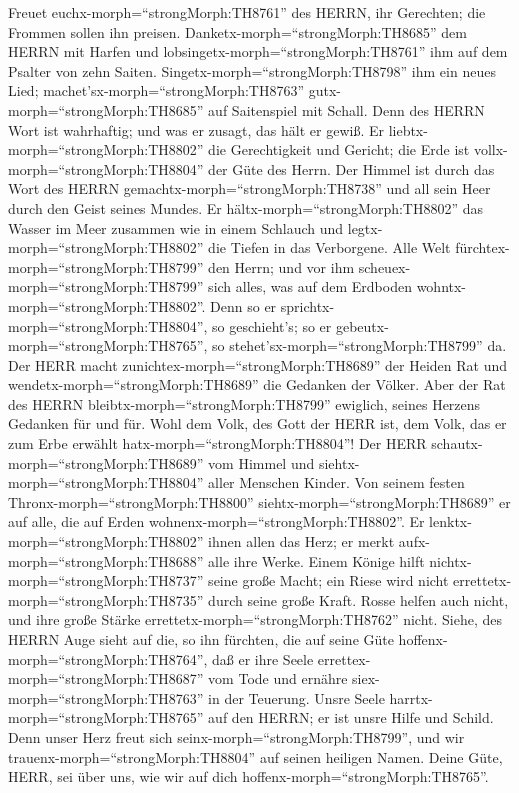  Freuet euchx-morph=``strongMorph:TH8761'' des HERRN, ihr
Gerechten; die Frommen sollen ihn preisen. 
Danketx-morph=``strongMorph:TH8685'' dem HERRN mit Harfen und
lobsingetx-morph=``strongMorph:TH8761'' ihm auf dem Psalter von zehn
Saiten.  Singetx-morph=``strongMorph:TH8798'' ihm ein neues
Lied; machet'sx-morph=``strongMorph:TH8763''
gutx-morph=``strongMorph:TH8685'' auf Saitenspiel mit Schall.
 Denn des HERRN Wort ist wahrhaftig; und was er zusagt, das
hält er gewiß.  Er liebtx-morph=``strongMorph:TH8802'' die
Gerechtigkeit und Gericht; die Erde ist
vollx-morph=``strongMorph:TH8804'' der Güte des Herrn.  Der
Himmel ist durch das Wort des HERRN
gemachtx-morph=``strongMorph:TH8738'' und all sein Heer durch den Geist
seines Mundes.  Er hältx-morph=``strongMorph:TH8802'' das
Wasser im Meer zusammen wie in einem Schlauch und
legtx-morph=``strongMorph:TH8802'' die Tiefen in das Verborgene.
 Alle Welt fürchtex-morph=``strongMorph:TH8799'' den Herrn;
und vor ihm scheuex-morph=``strongMorph:TH8799'' sich alles, was auf dem
Erdboden wohntx-morph=``strongMorph:TH8802''.  Denn so er
sprichtx-morph=``strongMorph:TH8804'', so geschieht's; so er
gebeutx-morph=``strongMorph:TH8765'', so
stehet'sx-morph=``strongMorph:TH8799'' da.  Der HERR macht
zunichtex-morph=``strongMorph:TH8689'' der Heiden Rat und
wendetx-morph=``strongMorph:TH8689'' die Gedanken der Völker.
 Aber der Rat des HERRN
bleibtx-morph=``strongMorph:TH8799'' ewiglich, seines Herzens Gedanken
für und für.  Wohl dem Volk, des Gott der HERR ist, dem
Volk, das er zum Erbe erwählt hatx-morph=``strongMorph:TH8804''!
 Der HERR schautx-morph=``strongMorph:TH8689'' vom Himmel
und siehtx-morph=``strongMorph:TH8804'' aller Menschen Kinder.
 Von seinem festen Thronx-morph=``strongMorph:TH8800''
siehtx-morph=``strongMorph:TH8689'' er auf alle, die auf Erden
wohnenx-morph=``strongMorph:TH8802''.  Er
lenktx-morph=``strongMorph:TH8802'' ihnen allen das Herz; er merkt
aufx-morph=``strongMorph:TH8688'' alle ihre Werke.  Einem
Könige hilft nichtx-morph=``strongMorph:TH8737'' seine große Macht; ein
Riese wird nicht errettetx-morph=``strongMorph:TH8735'' durch seine
große Kraft.  Rosse helfen auch nicht, und ihre große
Stärke errettetx-morph=``strongMorph:TH8762'' nicht. 
Siehe, des HERRN Auge sieht auf die, so ihn fürchten, die auf seine Güte
hoffenx-morph=``strongMorph:TH8764'',  daß er ihre Seele
errettex-morph=``strongMorph:TH8687'' vom Tode und ernähre
siex-morph=``strongMorph:TH8763'' in der Teuerung.  Unsre
Seele harrtx-morph=``strongMorph:TH8765'' auf den HERRN; er ist unsre
Hilfe und Schild.  Denn unser Herz freut sich
seinx-morph=``strongMorph:TH8799'', und wir
trauenx-morph=``strongMorph:TH8804'' auf seinen heiligen Namen.
 Deine Güte, HERR, sei über uns, wie wir auf dich
hoffenx-morph=``strongMorph:TH8765''.

